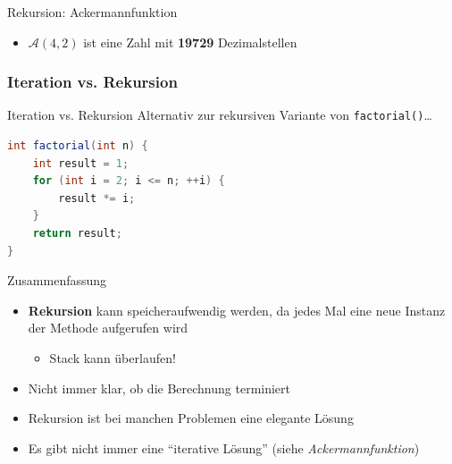 \documentclass[18pt]{beamer}
\newcommand{\quotes}[1]{``#1''}
\begin{document}
\begin{frame}{Rekursion: Ackermannfunktion}
    \begin{itemize}
        \item $\mathscr{A}(4, 2)$ ist eine Zahl mit \textbf{19729} Dezimalstellen
    \end{itemize}
\end{frame}


\subsubsection{Iteration vs. Rekursion}

\begin{frame}[fragile]{Iteration vs. Rekursion}
    Alternativ zur rekursiven Variante von \texttt{factorial()}\dots
    \begin{exampleblock}{}
        \begin{lstlisting}[language=Java,basicstyle=\scriptsize]
int factorial(int n) {
    int result = 1;
    for (int i = 2; i <= n; ++i) {
        result *= i;
    }
    return result;
}
        \end{lstlisting}

    \end{exampleblock}
\end{frame}

\begin{frame}{Zusammenfassung}
    \begin{itemize}
        \item \textbf{Rekursion} kann speicheraufwendig werden, da jedes Mal eine neue Instanz der Methode aufgerufen wird
        \begin{itemize}
            \item Stack kann überlaufen!
        \end{itemize}
        \item Nicht immer klar, ob die Berechnung terminiert
        \item Rekursion ist bei manchen Problemen eine elegante Lösung
        \item Es gibt nicht immer eine \quotes{iterative Lösung} (siehe \textit{Ackermannfunktion})
    \end{itemize}
\end{frame}
\end{document}
